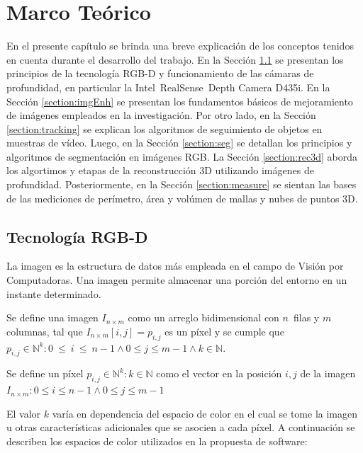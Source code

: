 \chapter{Marco Teórico}\label{chapter:theoretical-framework}


En el presente capítulo se brinda una breve explicación de los conceptos tenidos en cuenta durante el desarrollo del trabajo. En la Sección \ref{section:rgbd} se presentan los principios de la tecnología RGB-D y funcionamiento de las cámaras de profundidad, en particular la Intel~\textregistered RealSense~\texttrademark Depth Camera D435i. En la Sección \ref{section:imgEnh} se presentan los fundamentos básicos de mejoramiento de imágenes empleados en la investigación. Por otro lado, en la Sección \ref{section:tracking} se explican los algoritmos de seguimiento de objetos en muestras de vídeo. Luego, en la Sección \ref{section:seg} se detallan los principios y algoritmos de segmentación en imágenes RGB. La Sección \ref{section:rec3d} aborda los algortimos y etapas de la reconstrucción 3D utilizando imágenes de profundidad. Posteriormente, en la Sección \ref{section:measure} se sientan las bases de las mediciones de perímetro, área y volúmen de mallas y nubes de puntos 3D.

\section{Tecnología RGB-D}\label{section:rgbd}

La imagen es la estructura de datos más empleada en el campo de Visión por Computadoras. Una imagen permite almacenar una porción del entorno en un instante determinado.

\begin{definition}\label{def:img}
	Se define una imagen $I_{n \times m}$ como un arreglo bidimensional con $n$~filas y $m$ columnas, tal que $I_{n \times m}[i, j] = p_{i,j}$ es un píxel y se cumple que $p_{i, j} \in \mathbb{N}^k: 0~\leq~i~\leq~n -1 \wedge 0 \leq j \leq m - 1 \wedge k \in \mathbb{N}$.
\end{definition}

\begin{definition}
	Se define un píxel $p_{i, j} \in \mathbb{N}^k: k \in \mathbb{N}$ como el vector en la posición $i, j$ de la imagen $I_{n \times m}: 0 \leq i \leq n -1 \wedge 0 \leq j \leq m - 1$
\end{definition}

El valor $k$ varía en dependencia del espacio de color en el cual se tome la imagen u otras características adicionales que se asocien a cada píxel. A continuación se describen los espacios de color utilizados en la propuesta de software:

